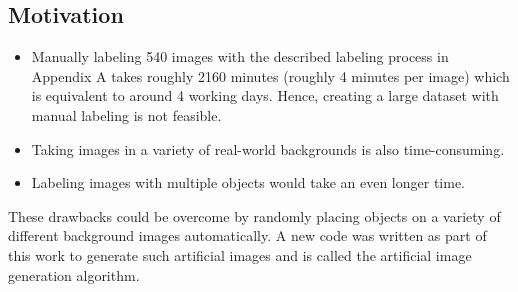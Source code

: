 \subsection{Motivation}
	\begin{itemize}
		\item Manually labeling 540 images with the described labeling process in Appendix A takes roughly 2160 minutes (roughly 4 minutes per image) which is equivalent to around 4 working days. Hence, creating a large dataset with manual labeling is not feasible.
		\item Taking images in a variety of real-world backgrounds is also time-consuming.
		\item Labeling images with multiple objects would take an even longer time.
	\end{itemize}
	
These drawbacks could be overcome by randomly placing objects on a variety of different background images automatically. A new code was written as part of this work to generate such artificial images and is called the artificial image generation algorithm.


